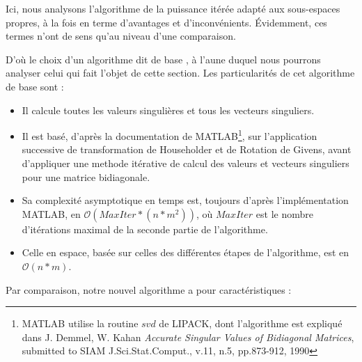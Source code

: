 \documentclass[a4paper,12pt]{article}
\begin{document}
        Ici, nous analysons l'algorithme de la puissance itérée adapté aux
        sous-espaces propres, à la fois en terme d'avantages et d'inconvénients.
        Évidemment, ces termes n'ont de sens qu'au niveau d'une comparaison.

        D'où le choix d'un algorithme dit \og de base \fg, à l'aune duquel nous
        pourrons analyser celui qui fait l'objet de cette section.  Les
        particularités de cet algorithme \og de base \fg sont :

        \begin{itemize}
        \item Il calcule toutes les valeurs singulières et tous les vecteurs
            singuliers.

        \item Il est basé, d'après la documentation de
            MATLAB\footnote{MATLAB utilise la routine $svd$ de LIPACK, dont
            l'algorithme est expliqué dans J. Demmel, W. Kahan
            \emph{Accurate Singular Values of Bidiagonal Matrices},
            submitted to SIAM J.Sci.Stat.Comput., v.11, n.5, pp.873-912,
            1990}, sur l'application successive de transformation de Householder
            et de Rotation de Givens, avant d'appliquer une methode itérative de
            calcul des valeurs et vecteurs singuliers pour une matrice
            bidiagonale.

        \item Sa complexité asymptotique en temps est, toujours d'après
            l'implémentation MATLAB, en $\mathcal{O}(MaxIter*(n*m^2))$, où
            $MaxIter$ est le nombre d'itérations maximal de la seconde
            partie de l'algorithme.

        \item Celle en espace, basée sur celles des différentes étapes de
            l'algorithme, est en $\mathcal{O}(n*m)$.
        \end{itemize}

    \bigskip

        Par comparaison, notre nouvel algorithme a pour caractéristiques :
\end{document}
